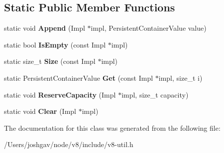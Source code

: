 \subsection*{Static Public Member Functions}
\begin{DoxyCompactItemize}
\item 
static void {\bfseries Append} (Impl $\ast$impl, Persistent\+Container\+Value value)\hypertarget{classv8_1_1_default_persistent_value_vector_traits_ac3088f4b37e68ca9ed668a859f89cf21}{}\label{classv8_1_1_default_persistent_value_vector_traits_ac3088f4b37e68ca9ed668a859f89cf21}

\item 
static bool {\bfseries Is\+Empty} (const Impl $\ast$impl)\hypertarget{classv8_1_1_default_persistent_value_vector_traits_a5b410d98817c143d2a3bf0e9dac34bd0}{}\label{classv8_1_1_default_persistent_value_vector_traits_a5b410d98817c143d2a3bf0e9dac34bd0}

\item 
static size\+\_\+t {\bfseries Size} (const Impl $\ast$impl)\hypertarget{classv8_1_1_default_persistent_value_vector_traits_a49748bb910ea3482c078c1a8e566bd44}{}\label{classv8_1_1_default_persistent_value_vector_traits_a49748bb910ea3482c078c1a8e566bd44}

\item 
static Persistent\+Container\+Value {\bfseries Get} (const Impl $\ast$impl, size\+\_\+t i)\hypertarget{classv8_1_1_default_persistent_value_vector_traits_ab9787aa7b041a30714cd17258c886cd7}{}\label{classv8_1_1_default_persistent_value_vector_traits_ab9787aa7b041a30714cd17258c886cd7}

\item 
static void {\bfseries Reserve\+Capacity} (Impl $\ast$impl, size\+\_\+t capacity)\hypertarget{classv8_1_1_default_persistent_value_vector_traits_afda15875d9691152b30549e4dbe4eb95}{}\label{classv8_1_1_default_persistent_value_vector_traits_afda15875d9691152b30549e4dbe4eb95}

\item 
static void {\bfseries Clear} (Impl $\ast$impl)\hypertarget{classv8_1_1_default_persistent_value_vector_traits_ab15a15e95f274defd3362536ae502361}{}\label{classv8_1_1_default_persistent_value_vector_traits_ab15a15e95f274defd3362536ae502361}

\end{DoxyCompactItemize}


The documentation for this class was generated from the following file\+:\begin{DoxyCompactItemize}
\item 
/\+Users/joshgav/node/v8/include/v8-\/util.\+h\end{DoxyCompactItemize}
